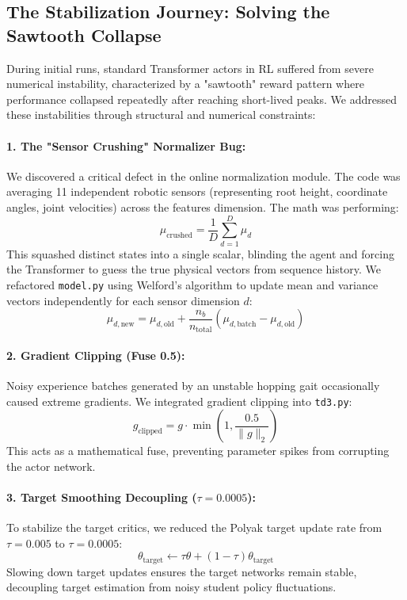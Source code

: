 \documentclass[11pt,a4paper]{article}
\begin{document}
\subsection{The Stabilization Journey: Solving the Sawtooth Collapse}
During initial runs, standard Transformer actors in RL suffered from severe numerical instability, characterized by a "sawtooth" reward pattern where performance collapsed repeatedly after reaching short-lived peaks. We addressed these instabilities through structural and numerical constraints:

\paragraph{1. The "Sensor Crushing" Normalizer Bug:}
We discovered a critical defect in the online normalization module. The code was averaging 11 independent robotic sensors (representing root height, coordinate angles, joint velocities) across the features dimension. The math was performing:
\begin{equation}
\mu_{\text{crushed}} = \frac{1}{D}\sum_{d=1}^D \mu_d
\end{equation}
This squashed distinct states into a single scalar, blinding the agent and forcing the Transformer to guess the true physical vectors from sequence history. We refactored \texttt{model.py} using Welford's algorithm to update mean and variance vectors independently for each sensor dimension $d$:
\begin{equation}
\mu_{d,\text{new}} = \mu_{d,\text{old}} + \frac{n_b}{n_{\text{total}}} \left(\mu_{d,\text{batch}} - \mu_{d,\text{old}}\right)
\end{equation}

\paragraph{2. Gradient Clipping (Fuse 0.5):}
Noisy experience batches generated by an unstable hopping gait occasionally caused extreme gradients. We integrated gradient clipping into \texttt{td3.py}:
\begin{equation}
g_{\text{clipped}} = g \cdot \min\left(1, \frac{0.5}{\|g\|_2}\right)
\end{equation}
This acts as a mathematical fuse, preventing parameter spikes from corrupting the actor network.

\paragraph{3. Target Smoothing Decoupling ($\tau=0.0005$):}
To stabilize the target critics, we reduced the Polyak target update rate from $\tau=0.005$ to $\tau=0.0005$:
\begin{equation}
\theta_{\text{target}} \leftarrow \tau \theta + (1-\tau) \theta_{\text{target}}
\end{equation}
Slowing down target updates ensures the target networks remain stable, decoupling target estimation from noisy student policy fluctuations.
\end{document}
